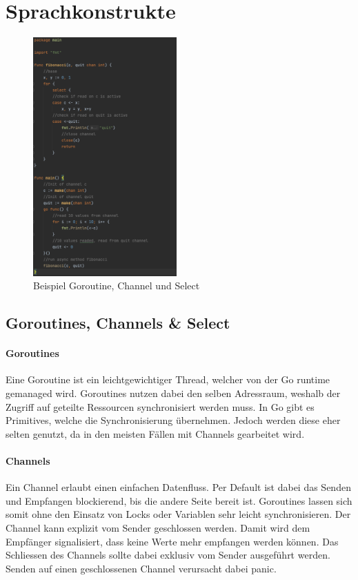 \documentclass[12pt,titlepage]{article}
\begin{document}
\section{Sprachkonstrukte}
\begin{figure}
	\includegraphics[width=5.5cm]{fibGoroutine}
	\caption{Beispiel Goroutine, Channel und Select}\label{img: fibGoroutine}
\end{figure}
\subsection{Goroutines, Channels \& Select}

\paragraph{Goroutines}
Eine Goroutine ist ein leichtgewichtiger Thread, welcher von der Go runtime gemanaged wird.
Goroutines nutzen dabei den selben Adressraum, weshalb der Zugriff auf geteilte Ressourcen synchronisiert werden muss.
In Go gibt es \glqq Primitives\grqq, welche die Synchronisierung übernehmen. Jedoch werden diese eher selten genutzt, da in den meisten Fällen mit Channels gearbeitet wird.
\paragraph{Channels}
Ein Channel erlaubt einen einfachen Datenfluss. Per Default ist dabei das Senden und Empfangen blockierend, bis die andere Seite bereit ist. Goroutines lassen sich somit ohne den Einsatz von Locks oder Variablen sehr leicht synchronisieren. Der Channel kann explizit vom Sender geschlossen werden. Damit wird dem Empfänger signalisiert, dass keine Werte mehr empfangen werden können. Das Schliessen des Channels sollte dabei exklusiv vom Sender ausgeführt werden. Senden auf einen geschlossenen Channel verursacht dabei \glqq panic\grqq.
\end{document}

